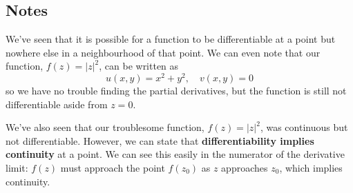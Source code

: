 \documentclass{article}
\renewcommand{\emph}{\textbf}
\begin{document}
\subsection{Notes}
We've seen that it is possible for a function to be differentiable at a point but nowhere else in a neighbourhood of that point. We can even note that our function, $f(z) = |z|^2$, can be written as
\[
	u(x, y) = x^2 + y^2,	\quad	v(x, y) = 0
\]
so we have no trouble finding the partial derivatives, but the function is still not differentiable aside from $z = 0$.

We've also seen that our troublesome function, $f(z) = |z|^2$, was continuous but not differentiable. However, we can state that \emph{differentiability implies continuity} at a point. We can see this easily in the numerator of the derivative limit: $f(z)$ must approach the point $f(z_0)$ as $z$ approaches $z_0$, which implies continuity.
\end{document}
